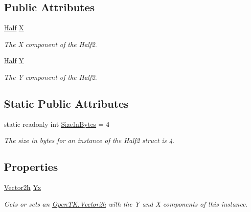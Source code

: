 \subsection*{Public Attributes}
\begin{DoxyCompactItemize}
\item 
\hyperlink{struct_open_t_k_1_1_half}{Half} \hyperlink{struct_open_t_k_1_1_vector2h_a40362fcbff82e522ff2fd6348a467fe4}{X}
\begin{DoxyCompactList}\small\item\em The X component of the Half2.\end{DoxyCompactList}\item 
\hyperlink{struct_open_t_k_1_1_half}{Half} \hyperlink{struct_open_t_k_1_1_vector2h_ac6224ec322ee311b9f7173c5c2cf0f34}{Y}
\begin{DoxyCompactList}\small\item\em The Y component of the Half2.\end{DoxyCompactList}\end{DoxyCompactItemize}
\subsection*{Static Public Attributes}
\begin{DoxyCompactItemize}
\item 
static readonly int \hyperlink{struct_open_t_k_1_1_vector2h_a3499ae9dc291a6ddc6ccee66e06a4cb2}{Size\-In\-Bytes} = 4
\begin{DoxyCompactList}\small\item\em The size in bytes for an instance of the Half2 struct is 4.\end{DoxyCompactList}\end{DoxyCompactItemize}
\subsection*{Properties}
\begin{DoxyCompactItemize}
\item 
\hyperlink{struct_open_t_k_1_1_vector2h}{Vector2h} \hyperlink{struct_open_t_k_1_1_vector2h_a74058642879f307742558b0a8d8b362e}{Yx}
\begin{DoxyCompactList}\small\item\em Gets or sets an \hyperlink{struct_open_t_k_1_1_vector2h}{Open\-T\-K.\-Vector2h} with the Y and X components of this instance. \end{DoxyCompactList}\end{DoxyCompactItemize}


